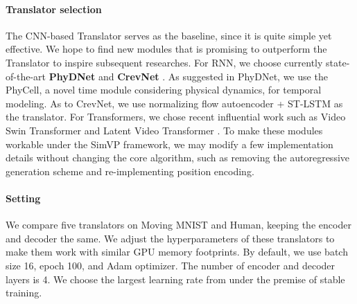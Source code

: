 \documentclass[10pt,twocolumn,letterpaper]{article}
\begin{document}
\paragraph{Translator selection} The CNN-based Translator serves as the baseline, since it is quite simple yet effective. We hope to find new modules that is promising to outperform the Translator to inspire subsequent researches. For RNN, we choose currently state-of-the-art \textbf{PhyDNet} \cite{guen2020disentangling} and \textbf{CrevNet} \cite{yu2019efficient}. 
As suggested in PhyDNet, we use the PhyCell, a novel time module considering physical dynamics, for temporal modeling. As to CrevNet, we use normalizing flow autoencoder + ST-LSTM \cite{wang2017predrnn} as the translator. For Transformers, we chose recent influential work such as Video Swin Transformer \cite{liu2021video} and Latent Video Transformer \cite{weissenborn2019scaling,rakhimov2020latent}. To make these modules workable under the SimVP framework, we may modify a few implementation details without changing the core algorithm, such as removing the autoregressive generation scheme and re-implementing position encoding.

\vspace{-2mm}
\paragraph{Setting} We compare five translators on Moving MNIST and Human, keeping the encoder and decoder the same. We adjust the hyperparameters of these translators to make them work with similar GPU memory footprints. By default, we use batch size 16, epoch 100, and Adam optimizer. The number of encoder and decoder layers is 4. We choose the largest learning rate from  under the premise of stable training. 
\end{document}

